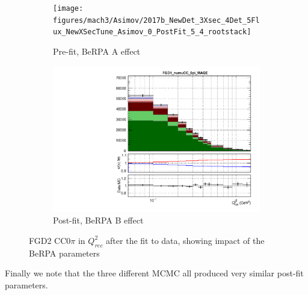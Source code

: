 \begin{figure}[h]
	\begin{subfigure}[t]{0.49\textwidth}
		\texttt{[image: figures/mach3/Asimov/2017b\_NewDet\_3Xsec\_4Det\_5Flux\_NewXSecTune\_Asimov\_0\_PostFit\_5\_4\_rootstack]}
		\caption{Pre-fit, BeRPA A effect}
	\end{subfigure}
	\begin{subfigure}[t]{0.49\textwidth}
		\includegraphics[width=\textwidth, trim={0mm 0mm 0mm 6mm}, clip,page=127]{figures/mach3/data/postfit/2017b_NewData_NewDet_UpdXsecStep_2Xsec_4Det_5Flux_0_PostFit_5_4_rootstack}
		\caption{Post-fit, BeRPA B effect}
	\end{subfigure}
	\caption{FGD2 CC$0\pi$ in $Q^2_{rec}$ after the fit to data, showing impact of the BeRPA parameters}
	\label{fig:fgd2_cc0pi_q2_berpa}
\end{figure}

Finally we note that the three different MCMC all produced very similar post-fit parameters.

